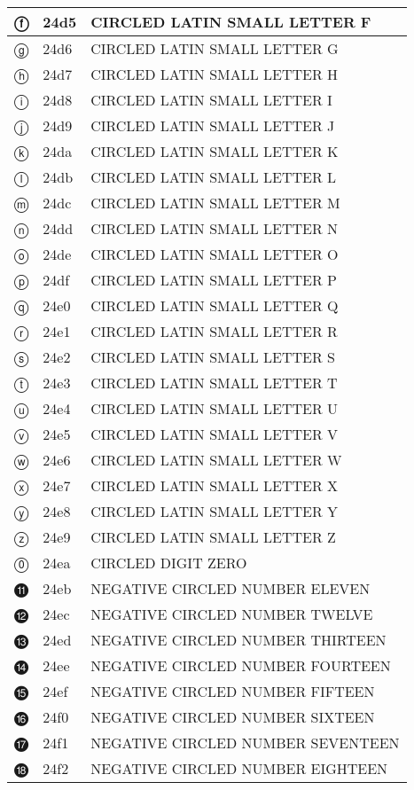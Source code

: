 \documentclass[12pt,letterpaper,openany]{book}
\begin{document}
\begin{center}
\begin{supertabular}{|m{0.25in}|m{0.5in}|m{4in}|}
ⓕ & 24d5 & CIRCLED LATIN SMALL LETTER F\\\hline
ⓖ & 24d6 & CIRCLED LATIN SMALL LETTER G\\\hline
ⓗ & 24d7 & CIRCLED LATIN SMALL LETTER H\\\hline
ⓘ & 24d8 & CIRCLED LATIN SMALL LETTER I\\\hline
ⓙ & 24d9 & CIRCLED LATIN SMALL LETTER J\\\hline
ⓚ & 24da & CIRCLED LATIN SMALL LETTER K\\\hline
ⓛ & 24db & CIRCLED LATIN SMALL LETTER L\\\hline
ⓜ & 24dc & CIRCLED LATIN SMALL LETTER M\\\hline
ⓝ & 24dd & CIRCLED LATIN SMALL LETTER N\\\hline
ⓞ & 24de & CIRCLED LATIN SMALL LETTER O\\\hline
ⓟ & 24df & CIRCLED LATIN SMALL LETTER P\\\hline
ⓠ & 24e0 & CIRCLED LATIN SMALL LETTER Q\\\hline
ⓡ & 24e1 & CIRCLED LATIN SMALL LETTER R\\\hline
ⓢ & 24e2 & CIRCLED LATIN SMALL LETTER S\\\hline
ⓣ & 24e3 & CIRCLED LATIN SMALL LETTER T\\\hline
ⓤ & 24e4 & CIRCLED LATIN SMALL LETTER U\\\hline
ⓥ & 24e5 & CIRCLED LATIN SMALL LETTER V\\\hline
ⓦ & 24e6 & CIRCLED LATIN SMALL LETTER W\\\hline
ⓧ & 24e7 & CIRCLED LATIN SMALL LETTER X\\\hline
ⓨ & 24e8 & CIRCLED LATIN SMALL LETTER Y\\\hline
ⓩ & 24e9 & CIRCLED LATIN SMALL LETTER Z\\\hline
⓪ & 24ea & CIRCLED DIGIT ZERO\\\hline
⓫ & 24eb & NEGATIVE CIRCLED NUMBER ELEVEN\\\hline
⓬ & 24ec & NEGATIVE CIRCLED NUMBER TWELVE\\\hline
⓭ & 24ed & NEGATIVE CIRCLED NUMBER THIRTEEN\\\hline
⓮ & 24ee & NEGATIVE CIRCLED NUMBER FOURTEEN\\\hline
⓯ & 24ef & NEGATIVE CIRCLED NUMBER FIFTEEN\\\hline
⓰ & 24f0 & NEGATIVE CIRCLED NUMBER SIXTEEN\\\hline
⓱ & 24f1 & NEGATIVE CIRCLED NUMBER SEVENTEEN\\\hline
⓲ & 24f2 & NEGATIVE CIRCLED NUMBER EIGHTEEN\\\hline

\end{supertabular}
\end{center}
\end{document}
